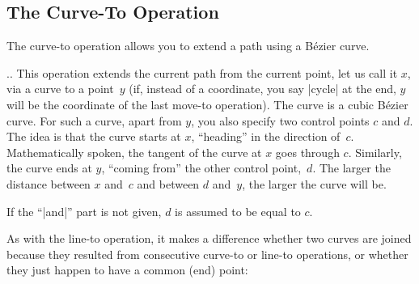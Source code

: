 \subsection{The Curve-To Operation}

The curve-to operation allows you to extend a path using a Bézier curve.

\begin{pathoperation}{..}{}
    This operation extends the current path from the current point, let us call
    it $x$, via a curve to a point~$y$ (if, instead of a coordinate, you say
    |cycle| at the end, $y$ will be the coordinate of the last move-to
    operation). The curve is a cubic Bézier curve. For such a curve, apart
    from $y$, you also specify two control points $c$ and $d$. The idea is that
    the curve starts at $x$, ``heading'' in the direction of~$c$.
    Mathematically spoken, the tangent of the curve at $x$ goes through $c$.
    Similarly, the curve ends at $y$, ``coming from'' the other control
    point,~$d$. The larger the distance between $x$ and~$c$ and between $d$
    and~$y$, the larger the curve will be.

    If the ``|and|'' part is not given, $d$ is assumed to be equal to
    $c$.
\begin{codeexample}[]
\end{codeexample}

\begin{codeexample}[]
\end{codeexample}

    As with the line-to operation, it makes a difference whether two curves are
    joined because they resulted from consecutive curve-to or line-to
    operations, or whether they just happen to have a common (end) point:
\begin{codeexample}[]
\end{codeexample}
\end{pathoperation}


